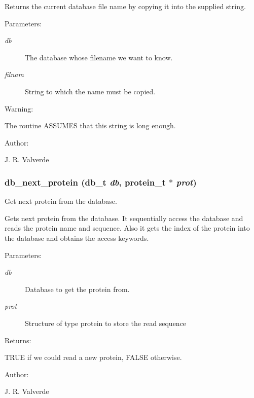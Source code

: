  Returns the current database file name by copying it into the supplied string.\begin{Desc}
\item[Parameters: ]\par
\begin{description}
\item[{\em 
db}]The database whose filename we want to know. \item[{\em 
filnam}]String to which the name must be copied.\end{description}
\end{Desc}
\begin{Desc}
\item[Warning: ]\par
The routine ASSUMES that this string is long enough.\end{Desc}
\begin{Desc}
\item[Author: ]\par
J. R. Valverde \end{Desc}
\subsubsection{ db\_\-next\_\-protein ({\bf db\_\-t} {\em db}, {\bf protein\_\-t} $\ast$ {\em prot})}\label{P__db_8h_a2}


Get next protein from the database.



 Gets next protein from the database. It sequentially access the database and reads the protein name and sequence. Also it gets the index of the protein into the database and obtains the access keywords.\begin{Desc}
\item[Parameters: ]\par
\begin{description}
\item[{\em 
db}]Database to get the protein from. \item[{\em 
prot}]Structure of type protein to store the read sequence\end{description}
\end{Desc}
\begin{Desc}
\item[Returns: ]\par
TRUE if we could read a new protein, FALSE otherwise.\end{Desc}
\begin{Desc}
\item[Author: ]\par
J. R. Valverde \end{Desc}
